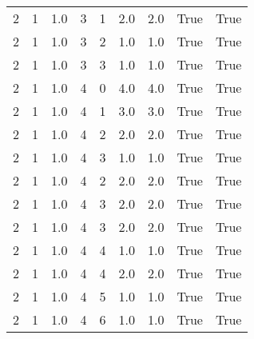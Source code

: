 \documentclass[a4paper,12pt]{article}
\begin{document}
\begin{center}
\begin{tabular}{ c c c | c c c | c | c | c}
        2 & 1 & 1.0 & 3 & 1 & 2.0 & 2.0 & True & True     \\
        2 & 1 & 1.0 & 3 & 2 & 1.0 & 1.0 & True & True     \\
        2 & 1 & 1.0 & 3 & 3 & 1.0 & 1.0 & True & True     \\
        2 & 1 & 1.0 & 4 & 0 & 4.0 & 4.0 & True & True     \\
        2 & 1 & 1.0 & 4 & 1 & 3.0 & 3.0 & True & True     \\
        2 & 1 & 1.0 & 4 & 2 & 2.0 & 2.0 & True & True     \\
        2 & 1 & 1.0 & 4 & 3 & 1.0 & 1.0 & True & True     \\
        2 & 1 & 1.0 & 4 & 2 & 2.0 & 2.0 & True & True     \\
        2 & 1 & 1.0 & 4 & 3 & 2.0 & 2.0 & True & True     \\
        2 & 1 & 1.0 & 4 & 3 & 2.0 & 2.0 & True & True     \\
        2 & 1 & 1.0 & 4 & 4 & 1.0 & 1.0 & True & True     \\
        2 & 1 & 1.0 & 4 & 4 & 2.0 & 2.0 & True & True     \\
        2 & 1 & 1.0 & 4 & 5 & 1.0 & 1.0 & True & True     \\
        2 & 1 & 1.0 & 4 & 6 & 1.0 & 1.0 & True & True     \\
    \end{tabular}
\end{center}
\end{document}
